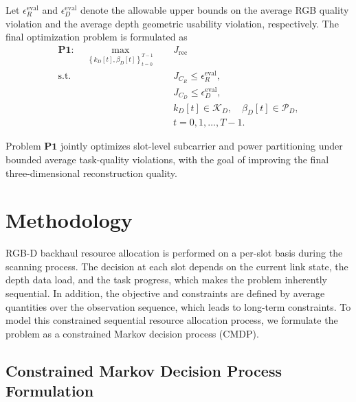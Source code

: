 \documentclass[journal]{IEEEtran}
\begin{document}
Let $\epsilon_R^{\mathrm{eval}}$ and $\epsilon_D^{\mathrm{eval}}$ denote the allowable upper bounds on the average RGB quality violation and the average depth geometric usability violation, respectively. The final optimization problem is formulated as
\begin{equation}
\begin{aligned}
\mathbf{P1:}\quad
\max_{\left\{k_D[t],\beta_D[t]\right\}_{t=0}^{T-1}}
\quad
& J_{\mathrm{rec}}
\\
\mathrm{s.t.}\quad
& J_{C_R}
\le
\epsilon_R^{\mathrm{eval}},
\\
& J_{C_D}
\le
\epsilon_D^{\mathrm{eval}},
\\
& k_D[t]
\in
\mathcal{K}_D,
\quad
\beta_D[t]
\in
\mathcal{P}_D,
\\
& t=0,1,\ldots,T-1.
\end{aligned}
\end{equation}

Problem $\mathbf{P1}$ jointly optimizes slot-level subcarrier and power partitioning under bounded average task-quality violations, with the goal of improving the final three-dimensional reconstruction quality.

\section{Methodology}
\label{sec:methodology}

RGB-D backhaul resource allocation is performed on a per-slot basis during the scanning process. The decision at each slot depends on the current link state, the depth data load, and the task progress, which makes the problem inherently sequential. In addition, the objective and constraints are defined by average quantities over the observation sequence, which leads to long-term constraints. To model this constrained sequential resource allocation process, we formulate the problem as a constrained Markov decision process (CMDP).

\subsection{Constrained Markov Decision Process Formulation}
\end{document}
